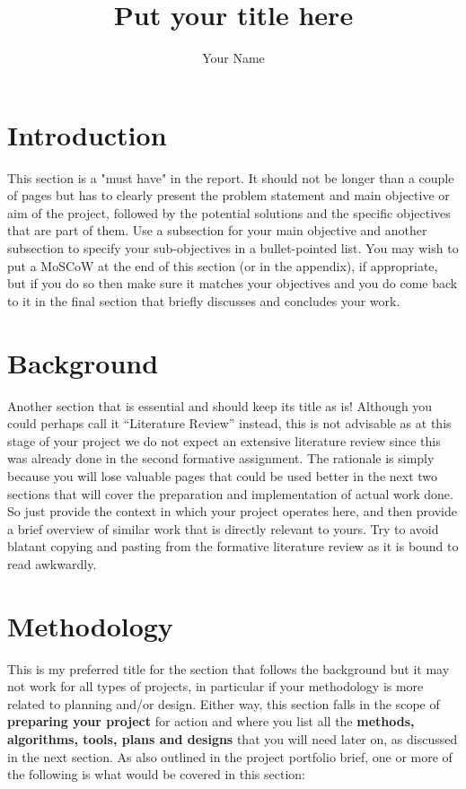 \documentclass[final]{cmpreport_02}
\title{Put your title here}
\author{Your Name}
\begin{document}
\section{Introduction}

This section is a "must have" in the report. It should not be longer than a couple of pages but has to  clearly present the problem statement and main objective or aim of the project, followed by the potential solutions and the specific objectives that are part of them. Use a subsection for your main objective and another subsection to specify your sub-objectives in a bullet-pointed list. You may wish to put a MoSCoW at the end of this section (or in the appendix), if appropriate, but if you do so then make sure it matches your objectives and you do come back to it in the final section that briefly discusses and concludes your work.

\section{Background}

Another section that is essential and should keep its title as is! Although you could perhaps call it ``Literature Review'' instead, this is not advisable as at this stage of your project we do not expect an extensive literature review since this was already done in the second formative assignment. The rationale is simply because you will lose valuable pages that could be used better in the next two sections that will cover the preparation and implementation of actual work done. So just provide the context in which your project operates here, and then provide a brief overview of similar work that is directly relevant to yours. Try to avoid blatant copying and pasting from the formative literature review as it is bound to read awkwardly.

\section{Methodology}

This is my preferred title for the section that follows the background but it may not work for all types of projects, in particular if your methodology is more related to planning and/or design. Either way, this section falls in the scope of \textbf{preparing your project} for action and where you list all the \textbf{methods, algorithms, tools, plans and designs} that you will need later on, as discussed in the next section. As also outlined in the project portfolio brief, one or more of the following is what would be covered in this section:
\end{document}
